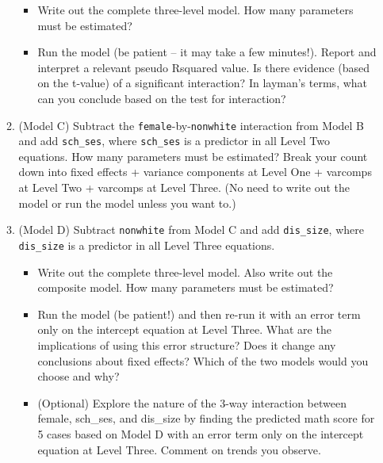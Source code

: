 \documentclass[
]{krantz}
\providecommand{\tightlist}{%
  \setlength{\itemsep}{0pt}\setlength{\parskip}{0pt}}
\begin{document}
\begin{enumerate}
\begin{enumerate}
    \begin{itemize}
    \tightlist
    \item
      Write out the complete three-level model. How many parameters must be estimated?
    \item
      Run the model (be patient -- it may take a few minutes!). Report and interpret a relevant pseudo Rsquared value. Is there evidence (based on the t-value) of a significant interaction? In layman's terms, what can you conclude based on the test for interaction?
    \end{itemize}
  \item
    (Model C) Subtract the \texttt{female}-by-\texttt{nonwhite} interaction from Model B and add \texttt{sch\_ses}, where \texttt{sch\_ses} is a predictor in all Level Two equations. How many parameters must be estimated? Break your count down into fixed effects + variance components at Level One + varcomps at Level Two + varcomps at Level Three. (No need to write out the model or run the model unless you want to.)
  \item
    (Model D) Subtract \texttt{nonwhite} from Model C and add \texttt{dis\_size}, where \texttt{dis\_size} is a predictor in all Level Three equations.

    \begin{itemize}
    \tightlist
    \item
      Write out the complete three-level model. Also write out the composite model. How many parameters must be estimated?
    \item
      Run the model (be patient!) and then re-run it with an error term only on the intercept equation at Level Three. What are the implications of using this error structure? Does it change any conclusions about fixed effects? Which of the two models would you choose and why?
    \item
      (Optional) Explore the nature of the 3-way interaction between female, sch\_ses, and dis\_size by finding the predicted math score for 5 cases based on Model D with an error term only on the intercept equation at Level Three. Comment on trends you observe.


\end{itemize}
\end{enumerate}
\end{enumerate}
\end{document}
